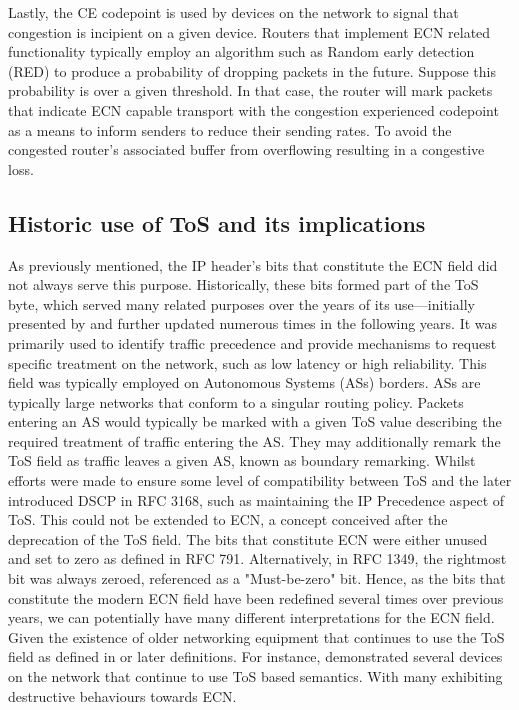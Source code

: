 \documentclass{l4proj}
\begin{document}
Lastly, the CE codepoint is used by devices on the network to signal that congestion is incipient on a given device. Routers that implement ECN related functionality typically employ an algorithm such as Random early detection (RED) to produce a probability of dropping packets in the future. Suppose this probability is over a given threshold. In that case, the router will mark packets that indicate ECN capable transport with the congestion experienced codepoint as a means to inform senders to reduce their sending rates. To avoid the congested router's associated buffer from overflowing resulting in a congestive loss.

\subsection{Historic use of ToS and its implications}

As previously mentioned, the IP header's bits that constitute the ECN field did not always serve this purpose. Historically, these bits formed part of the ToS byte, which served many related purposes over the years of its use—initially presented by \citep{rfc791} and further updated numerous times in the following years. It was primarily used to identify traffic precedence and provide mechanisms to request specific treatment on the network, such as low latency or high reliability. This field was typically employed on Autonomous Systems (ASs) borders. ASs are typically large networks that conform to a singular routing policy. Packets entering an AS would typically be marked with a given ToS value describing the required treatment of traffic entering the AS. They may additionally remark the ToS field as traffic leaves a given AS, known as boundary remarking. Whilst efforts were made to ensure some level of compatibility between ToS and the later introduced DSCP in RFC 3168, such as maintaining the IP Precedence aspect of ToS\citep{rfc3168}. This could not be extended to ECN, a concept conceived after the deprecation of the ToS field. The bits that constitute ECN were either unused and set to zero as defined in RFC 791\citep{rfc791}. Alternatively, in RFC 1349, the rightmost bit was always zeroed, referenced as a "Must-be-zero" bit\citep{rfc1349}. Hence, as the bits that constitute the modern ECN field have been redefined several times over previous years, we can potentially have many different interpretations for the ECN field. Given the existence of older networking equipment that continues to use the ToS field as defined in \cite{rfc791} or later definitions. For instance, \cite{custura_exploring_2017} demonstrated several devices on the network that continue to use ToS based semantics. With many exhibiting destructive behaviours towards ECN.
\end{document}
